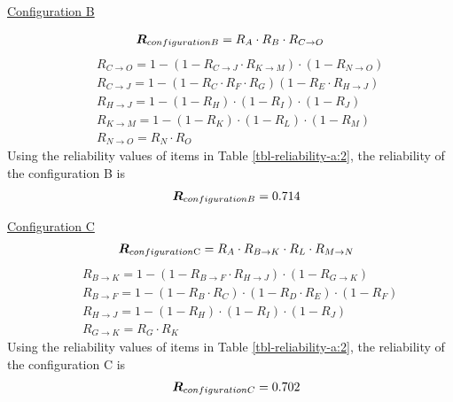 \underline{Configuration B}

\begin{eqnarray}
{\vec R_{configuration{\rm{ }}B}} = {R_A} \cdot {R_B} \cdot {R_{C \to O}}
\label{eq-reliability-a9}
\end{eqnarray}
%
\begin{eqnarray}
&& {R_{C \to O}} = 1 - (1 - {R_{C \to J}} \cdot {R_{K \to M}}) \cdot (1 - {R_{N \to
O}})
\label{eq-reliability-a10}\\
&& {R_{C \to J}} = 1 - (1 - {R_C} \cdot {R_F} \cdot {R_G})(1 - {R_E} \cdot {R_{H
\to J}})
\label{eq-reliability-a11}\\
&&{R_{H \to J}} = 1 - (1 - {R_H}) \cdot (1 - {R_I}) \cdot (1 - {R_J})
\label{eq-reliability-a12}\\
&& {R_{K \to M}} = 1 - (1 - {R_K}) \cdot (1 - {R_L}) \cdot (1 - {R_M})
\label{eq-reliability-a13}\\
&& {R_{N \to O}} = {R_N} \cdot {R_O}
\label{eq-reliability-a14}
\end{eqnarray}
%
%
Using the reliability values of items in Table \ref{tbl-reliability-a:2}, the reliability of
the configuration B is
%
\begin{eqnarray}
&& {\vec R_{configuration{\rm{ }}B}} = 0.714 \nonumber
\end{eqnarray}

\underline{Configuration C}
\begin{eqnarray}
&& {\vec R_{configuration{\rm{ C}}}} = {R_A} \cdot {R_{B \to K}} \cdot {R_L} \cdot
{R_{M \to N}}
\label{eq-reliability-a15}
\end{eqnarray}
\begin{eqnarray}
&& {R_{B \to K}} = 1 - (1 - {R_{B \to F}} \cdot {R_{H \to J}}) \cdot (1 - {R_{G \to
K}})
\label{eq-reliability-a16}\\
&& {R_{B \to F}} = 1 - (1 - {R_B} \cdot {R_C}) \cdot (1 - {R_D} \cdot {R_E}) \cdot
(1 - {R_F})
\label{eq-reliability-a17}\\
&& {R_{H \to J}} = 1 - (1 - {R_H}) \cdot (1 - {R_I}) \cdot (1 - {R_J})
\label{eq-reliability-a18}\\
&& {R_{G \to K}} = {R_G} \cdot {R_K}
\label{eq-reliability-a19}
\end{eqnarray}
Using the reliability values of items in Table \ref{tbl-reliability-a:2}, the reliability of
the configuration C is
\begin{eqnarray}
&& {\vec R_{configuration{\rm{ }}C}} = 0.702\nonumber
\end{eqnarray}

